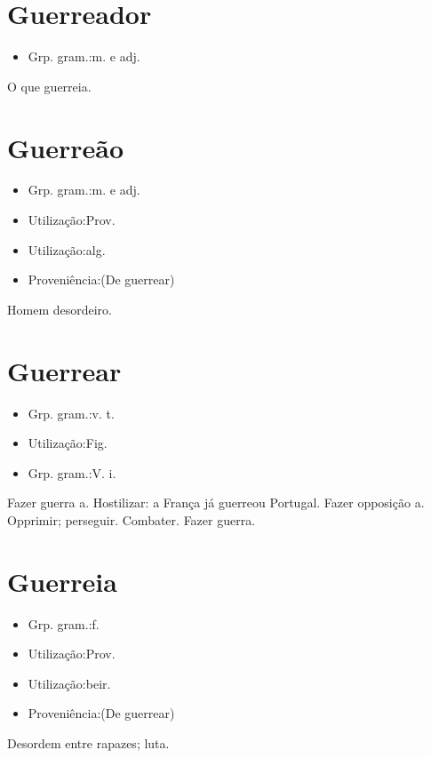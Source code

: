 \section{Guerreador}
\begin{itemize}
\item {Grp. gram.:m.  e  adj.}
\end{itemize}
O que guerreia.
\section{Guerreão}
\begin{itemize}
\item {Grp. gram.:m.  e  adj.}
\end{itemize}
\begin{itemize}
\item {Utilização:Prov.}
\end{itemize}
\begin{itemize}
\item {Utilização:alg.}
\end{itemize}
\begin{itemize}
\item {Proveniência:(De \textunderscore guerrear\textunderscore )}
\end{itemize}
Homem desordeiro.
\section{Guerrear}
\begin{itemize}
\item {Grp. gram.:v. t.}
\end{itemize}
\begin{itemize}
\item {Utilização:Fig.}
\end{itemize}
\begin{itemize}
\item {Grp. gram.:V. i.}
\end{itemize}
Fazer guerra a.
Hostilizar: \textunderscore a França já guerreou Portugal\textunderscore .
Fazer opposição a.
Opprimir; perseguir.
Combater.
Fazer guerra.
\section{Guerreia}
\begin{itemize}
\item {Grp. gram.:f.}
\end{itemize}
\begin{itemize}
\item {Utilização:Prov.}
\end{itemize}
\begin{itemize}
\item {Utilização:beir.}
\end{itemize}
\begin{itemize}
\item {Proveniência:(De \textunderscore guerrear\textunderscore )}
\end{itemize}
Desordem entre rapazes; luta.
